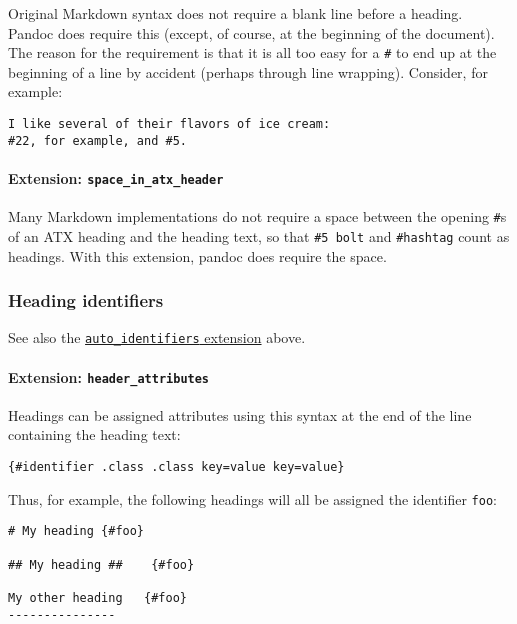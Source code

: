 \documentclass[
]{article}
\begin{document}
Original Markdown syntax does not require a blank line before a heading.
Pandoc does require this (except, of course, at the beginning of the
document). The reason for the requirement is that it is all too easy for
a \texttt{\#} to end up at the beginning of a line by accident (perhaps
through line wrapping). Consider, for example:

\begin{verbatim}
I like several of their flavors of ice cream:
#22, for example, and #5.
\end{verbatim}

\paragraph{\texorpdfstring{Extension:
\texttt{space\_in\_atx\_header}}{Extension: space\_in\_atx\_header}}\label{extension-space_in_atx_header}

Many Markdown implementations do not require a space between the opening
\texttt{\#}s of an ATX heading and the heading text, so that
\texttt{\#5\ bolt} and \texttt{\#hashtag} count as headings. With this
extension, pandoc does require the space.

\subsubsection{Heading identifiers}\label{heading-identifiers}

See also the
\hyperref[extension-auto_identifiers]{\texttt{auto\_identifiers}
extension} above.

\paragraph{\texorpdfstring{Extension:
\texttt{header\_attributes}}{Extension: header\_attributes}}\label{extension-header_attributes}

Headings can be assigned attributes using this syntax at the end of the
line containing the heading text:

\begin{verbatim}
{#identifier .class .class key=value key=value}
\end{verbatim}

Thus, for example, the following headings will all be assigned the
identifier \texttt{foo}:

\begin{verbatim}
# My heading {#foo}

## My heading ##    {#foo}

My other heading   {#foo}
---------------
\end{verbatim}
\end{document}
